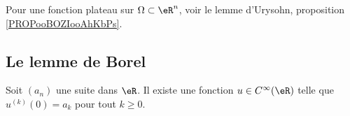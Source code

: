 Pour une fonction plateau sur \( \Omega\subset \eR^n\), voir le lemme d'Urysohn, proposition \ref{PROPooBOZIooAhKbPs}.

\subsection{Le lemme de Borel}

\begin{lemma} \label{LemRENlIEL}
	Soit \( (a_n)\) une suite dans \( \eR\). Il existe une fonction \( u\in C^{\infty}(\eR)\) telle que \( u^{(k)}(0)=a_k\) pour tout \( k\geq 0\).
\end{lemma}

